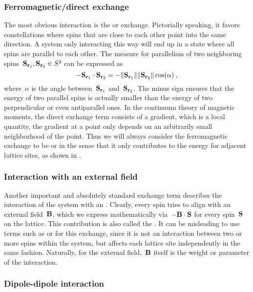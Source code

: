 \subsubsection{Ferromagnetic/direct exchange}

The most obvious interaction is the  or 
exchange. Pictorially speaking, it favors constellations where spins that are
close to each other point into the same direction. A system only interacting
this way will end up in a state where all spins are parallel to each other. The
measure for parallelism of two neighboring spins~$\S_{\r_1}, \S_{\r_2} \in S^2$
can be expressed as
%
\begin{equation}
  -\S_{\r_1} \cdot \S_{\r_2} =
  -\norm{\S_{\r_1}} \norm{\S_{\r_2}} \cos(\alpha) \:,
\end{equation}
%
where~$\alpha$ is the angle between~$\S_{\r_1}$ and~$\S_{\r_2}$. The minus sign
ensures that the energy of two parallel spins is actually smaller than the
energy of two perpendicular or even antiparallel ones. In the continuum theory
of magnetic moments, the direct exchange term consists of a gradient, which is a
local quantity, \ie{} the gradient at a point only depends on an arbitrarily
small neighborhood of the point. Thus we will always consider the ferromagnetic
exchange to be  or  in the sense that it
only contributes to the energy for adjacent lattice sites, as shown in
.

\subsubsection{Interaction with an external field}

Another important and absolutely standard exchange term describes the
interaction of the system with an . Clearly,
every spin tries to align with an external field~$\B$, which we express
mathematically via~$-\B \cdot \S$ for every spin~$\S$ on the lattice. This
contribution is also called the . It can be misleading to
use terms such as  or  for this
exchange, since it is not an interaction between two or more spins within the
system, but affects each lattice site independently in the same fashion.
Naturally, for the external field,~$\B$ itself is the weight or parameter of the
interaction.

\subsubsection{Dipole-dipole interaction}

